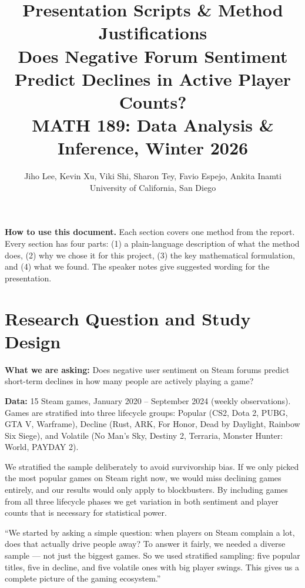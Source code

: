 \documentclass[11pt, letterpaper]{article}
\title{\textbf{Presentation Scripts \& Method Justifications}\\[0.4em]
\large Does Negative Forum Sentiment Predict Declines in Active Player Counts?\\[0.3em]
\normalsize MATH 189: Data Analysis \& Inference, Winter 2026}
\author{Jiho Lee, Kevin Xu, Viki Shi, Sharon Tey, Favio Espejo, Ankita Inamti\\
\small University of California, San Diego}
\date{}
\theoremstyle{definition}
\begin{document}
\maketitle
\thispagestyle{empty}

\begin{speakerbox}
\textbf{How to use this document.}
Each section covers one method from the report.
Every section has four parts:
(1) a plain-language description of what the method does,
(2) why we chose it for this project,
(3) the key mathematical formulation, and
(4) what we found.
The speaker notes give suggested wording for the presentation.
\end{speakerbox}

\tableofcontents
\newpage

\section{Research Question and Study Design}

\textbf{What we are asking:} Does negative user sentiment on Steam forums predict short-term declines in how many people are actively playing a game?

\textbf{Data:} 15 Steam games, January 2020 -- September 2024 (weekly observations). Games are stratified into three lifecycle groups: Popular (CS2, Dota 2, PUBG, GTA V, Warframe), Decline (Rust, ARK, For Honor, Dead by Daylight, Rainbow Six Siege), and Volatile (No Man's Sky, Destiny 2, Terraria, Monster Hunter: World, PAYDAY 2).

\begin{whybox}
We stratified the sample deliberately to avoid survivorship bias.
If we only picked the most popular games on Steam right now, we would miss declining games entirely, and our results would only apply to blockbusters.
By including games from all three lifecycle phases we get variation in both sentiment and player counts that is necessary for statistical power.
\end{whybox}

\begin{speakerbox}
``We started by asking a simple question: when players on Steam complain a lot, does that actually drive people away?
To answer it fairly, we needed a diverse sample --- not just the biggest games.
So we used stratified sampling: five popular titles, five in decline, and five volatile ones with big player swings.
This gives us a complete picture of the gaming ecosystem.''
\end{speakerbox}
\end{document}
